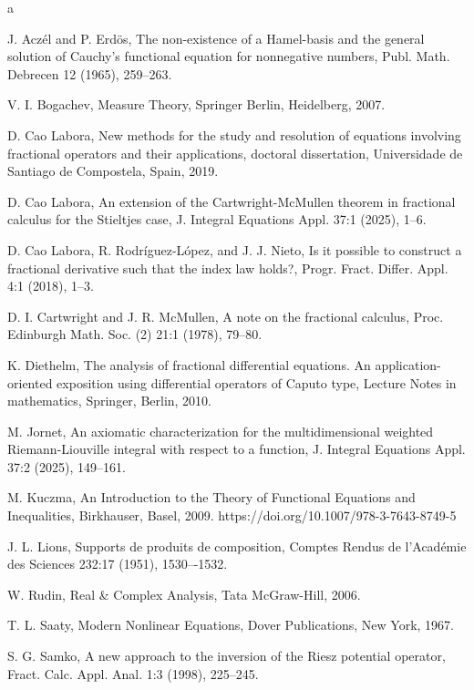 \documentclass[12pt,reqno]{amsart}
\theoremstyle{plain}
\numberwithin{equation}{section} %
\begin{document}
\begin{thebibliography}{a}

J. Acz\'el and P. Erd\"os, The non-existence of a Hamel-basis and the general solution of Cauchy's functional equation for nonnegative numbers, Publ. Math. Debrecen 12 (1965), 259--263.

V. I. Bogachev, Measure Theory, Springer Berlin, Heidelberg, 2007.

D. Cao Labora, New methods for the study and resolution of equations involving fractional operators and their applications, doctoral dissertation, Universidade de Santiago de Compostela, Spain, 2019.

D. Cao Labora, An extension of the Cartwright-McMullen theorem in fractional calculus for the Stieltjes case, J. Integral Equations Appl. 37:1 (2025), 1--6.

D. Cao Labora, R. Rodr\'iguez-L\'opez, and J. J. Nieto, Is it possible to construct a fractional derivative such that the index law holds?, Progr. Fract. Differ. Appl. 4:1 (2018), 1--3.

D. I. Cartwright and J. R. McMullen, A note on the fractional calculus, Proc. Edinburgh Math. Soc. (2) 21:1 (1978), 79--80.

K. Diethelm, The analysis of fractional differential equations. An application-oriented exposition using differential operators of Caputo type, Lecture Notes in mathematics, Springer, Berlin, 2010.

M. Jornet, An axiomatic characterization for the multidimensional weighted Riemann-Liouville integral with respect to a function, J. Integral Equations Appl. 37:2 (2025), 149--161.

M. Kuczma, An Introduction to the Theory of Functional Equations and Inequalities, Birkhauser, Basel, 2009. https://doi.org/10.1007/978-3-7643-8749-5

J. L. Lions, Supports de produits de composition, Comptes Rendus de l'Académie des Sciences 232:17 (1951), 1530–-1532.

W. Rudin, Real \& Complex Analysis, Tata McGraw-Hill, 2006.

T. L. Saaty, Modern Nonlinear Equations, Dover Publications, New York, 1967. 

S. G. Samko, A new approach to the inversion of the Riesz potential operator, Fract. Calc. Appl. Anal. 1:3 (1998), 225--245.

\end{thebibliography}
\end{document}
